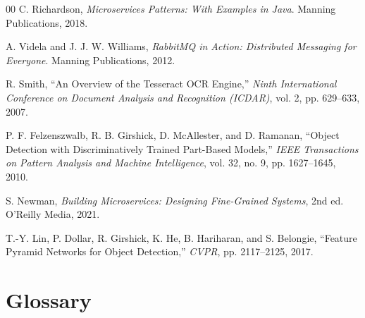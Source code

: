 \documentclass[12pt,a4paper]{report}
\begin{document}
\begin{thebibliography}{00}
 C. Richardson, \textit{Microservices Patterns: With Examples in Java}. Manning Publications, 2018.

 A. Videla and J. J. W. Williams, \textit{RabbitMQ in Action: Distributed Messaging for Everyone}. Manning Publications, 2012.

 R. Smith, ``An Overview of the Tesseract OCR Engine,'' \textit{Ninth International Conference on Document Analysis and Recognition (ICDAR)}, vol. 2, pp. 629--633, 2007.

 P. F. Felzenszwalb, R. B. Girshick, D. McAllester, and D. Ramanan, ``Object Detection with Discriminatively Trained Part-Based Models,'' \textit{IEEE Transactions on Pattern Analysis and Machine Intelligence}, vol. 32, no. 9, pp. 1627--1645, 2010.

 S. Newman, \textit{Building Microservices: Designing Fine-Grained Systems}, 2nd ed. O'Reilly Media, 2021.

 T.-Y. Lin, P. Dollar, R. Girshick, K. He, B. Hariharan, and S. Belongie, ``Feature Pyramid Networks for Object Detection,'' \textit{CVPR}, pp. 2117--2125, 2017.

\end{thebibliography}

\appendix

\chapter{Glossary}
\end{document}
